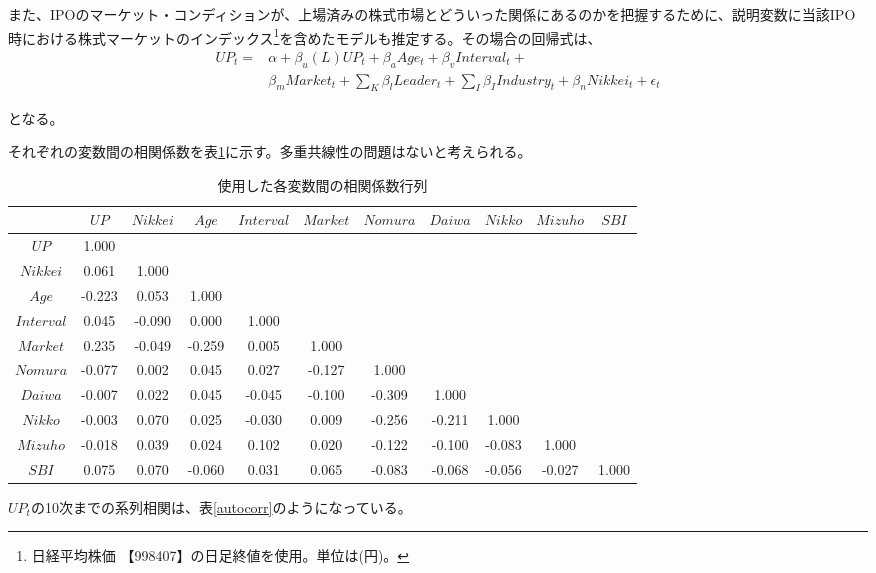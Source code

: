 \documentclass{jsarticle}
\begin{document}
また、IPOのマーケット・コンディションが、上場済みの株式市場とどういった関係にあるのかを把握するために、説明変数に当該IPO時における株式マーケットのインデックス\footnote[14]{日経平均株価 【998407】の日足終値を使用。単位は(円)。}を含めたモデルも推定する。その場合の回帰式は、
\begin{equation}
\label{nikkeireg}
\begin{split}
	UP_t =  &\alpha + \beta_u (L) UP_t + \beta_a Age_t + \beta_v Interval_t + \\
	   &\beta_m Market_t + \sum_{K} \beta_l Leader_t +  \sum_{I} \beta_I Industry_t + \beta_n Nikkei_t+  \epsilon_t
\end{split}
\end{equation}

となる。\par

\newpage

それぞれの変数間の相関係数を表\ref{corr}に示す。多重共線性の問題はないと考えられる。
\begin{table}[t]
  \begin{center}
  \caption{使用した各変数間の相関係数行列}
\begin{tabular}{c|cccccccccc}
\hline
 & $UP$ & $Nikkei$ & $Age$ & $Interval$ & $Market$ & $Nomura$ & $Daiwa$ & $Nikko$ & $Mizuho$ & $SBI$ \\
 \hline
$UP$ & 1.000 & &&&&&&&& \\
$Nikkei$ & 0.061 & 1.000 & &&&&&&& \\
$Age$ & -0.223 & 0.053 & 1.000 & &&&&&&  \\
$Interval$ & 0.045 & -0.090 & 0.000 & 1.000 & &&&&& \\
$Market$ & 0.235 & -0.049 & -0.259 & 0.005 & 1.000 & &&&& \\
$Nomura$ & -0.077 & 0.002 & 0.045 & 0.027 & -0.127 & 1.000 & &&& \\
$Daiwa$ & -0.007 & 0.022 & 0.045 & -0.045 & -0.100 & -0.309 & 1.000 & && \\
$Nikko$ & -0.003 & 0.070 & 0.025 & -0.030 & 0.009 & -0.256 & -0.211 & 1.000 &  &  \\
$Mizuho$ & -0.018 & 0.039 & 0.024 & 0.102 & 0.020 & -0.122 & -0.100 & -0.083 & 1.000 & \\
$SBI$ & 0.075 & 0.070 & -0.060 & 0.031 & 0.065 & -0.083 & -0.068 & -0.056 & -0.027 & 1.000 \\
\hline
	\end{tabular}
	\label{corr} 
  \end{center}
\end{table}
\par
$UP_t$の10次までの系列相関は、表\ref{autocorr}のようになっている。
\end{document}
